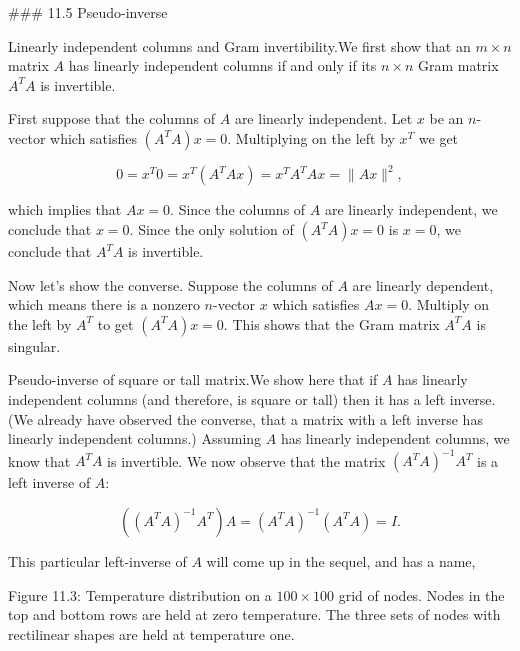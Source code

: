 

### 11.5 Pseudo-inverse

Linearly independent columns and Gram invertibility.We first show that an \(m\times n\) matrix \(A\) has linearly independent columns if and only if its \(n\times n\) Gram matrix \(A^{T}A\) is invertible.

First suppose that the columns of \(A\) are linearly independent. Let \(x\) be an \(n\)-vector which satisfies \((A^{T}A)x=0\). Multiplying on the left by \(x^{T}\) we get

\[0=x^{T}0=x^{T}(A^{T}Ax)=x^{T}A^{T}Ax=\|Ax\|^{2},\]

which implies that \(Ax=0\). Since the columns of \(A\) are linearly independent, we conclude that \(x=0\). Since the only solution of \((A^{T}A)x=0\) is \(x=0\), we conclude that \(A^{T}A\) is invertible.

Now let's show the converse. Suppose the columns of \(A\) are linearly dependent, which means there is a nonzero \(n\)-vector \(x\) which satisfies \(Ax=0\). Multiply on the left by \(A^{T}\) to get \((A^{T}A)x=0\). This shows that the Gram matrix \(A^{T}A\) is singular.

Pseudo-inverse of square or tall matrix.We show here that if \(A\) has linearly independent columns (and therefore, is square or tall) then it has a left inverse. (We already have observed the converse, that a matrix with a left inverse has linearly independent columns.) Assuming \(A\) has linearly independent columns, we know that \(A^{T}A\) is invertible. We now observe that the matrix \((A^{T}A)^{-1}A^{T}\) is a left inverse of \(A\):

\[\left((A^{T}A)^{-1}A^{T}\right)A=(A^{T}A)^{-1}(A^{T}A)=I.\]

This particular left-inverse of \(A\) will come up in the sequel, and has a name,

Figure 11.3: Temperature distribution on a \(100\times 100\) grid of nodes. Nodes in the top and bottom rows are held at zero temperature. The three sets of nodes with rectilinear shapes are held at temperature one.

